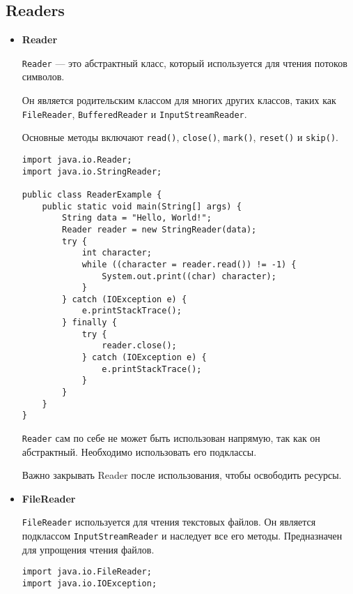 \subsection{Readers}
\begin{itemize}
    \item \textbf{Reader} \par 
    \texttt{Reader} — это абстрактный класс, который используется для чтения потоков символов. \par
    Он является родительским классом для многих других классов, таких как \texttt{FileReader}, \texttt{BufferedReader} и \texttt{InputStreamReader}. \par 
    Основные методы включают \texttt{read()}, \texttt{close()}, \texttt{mark()}, \texttt{reset()} и \texttt{skip()}.
    \begin{verbatim}
import java.io.Reader;
import java.io.StringReader;

public class ReaderExample {
    public static void main(String[] args) {
        String data = "Hello, World!";
        Reader reader = new StringReader(data);
        try {
            int character;
            while ((character = reader.read()) != -1) {
                System.out.print((char) character);
            }
        } catch (IOException e) {
            e.printStackTrace();
        } finally {
            try {
                reader.close();
            } catch (IOException e) {
                e.printStackTrace();
            }
        }
    }
}
    \end{verbatim}
    \texttt{Reader} сам по себе не может быть использован напрямую, так как он абстрактный. Необходимо использовать его подклассы. \par
    Важно закрывать Reader после использования, чтобы освободить ресурсы.

    \item \textbf{FileReader} \par
    \texttt{FileReader} используется для чтения текстовых файлов. Он является подклассом \texttt{InputStreamReader} и наследует все его методы. Предназначен для упрощения чтения файлов.
    \begin{verbatim}
import java.io.FileReader;
import java.io.IOException;


\end{verbatim}
\end{itemize}
